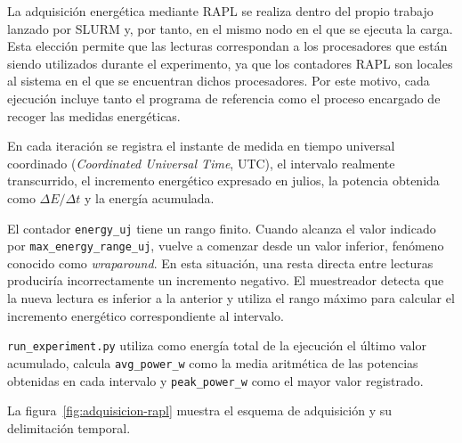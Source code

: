 La adquisición energética mediante RAPL se realiza dentro del propio trabajo lanzado por SLURM y, por tanto, en el mismo nodo en el que se ejecuta la carga. Esta elección permite que las lecturas correspondan a los procesadores que están siendo utilizados durante el experimento, ya que los contadores RAPL son locales al sistema en el que se encuentran dichos procesadores. Por este motivo, cada ejecución incluye tanto el programa de referencia como el proceso encargado de recoger las medidas energéticas.

En cada iteración se registra el instante de medida en tiempo universal coordinado (\textit{Coordinated Universal Time}, UTC), el intervalo realmente transcurrido, el incremento energético expresado en julios, la potencia obtenida como \(\Delta E / \Delta t\) y la energía acumulada.

El contador \texttt{energy\_uj} tiene un rango finito. Cuando alcanza el valor indicado por \texttt{max\_energy\_range\_uj}, vuelve a comenzar desde un valor inferior, fenómeno conocido como \emph{wraparound}. En esta situación, una resta directa entre lecturas produciría incorrectamente un incremento negativo. El muestreador detecta que la nueva lectura es inferior a la anterior y utiliza el rango máximo para calcular el incremento energético correspondiente al intervalo.

\texttt{run\_experiment.py} utiliza como energía total de la ejecución el último valor acumulado, calcula \texttt{avg\_power\_w} como la media aritmética de las potencias obtenidas en cada intervalo y \texttt{peak\_power\_w} como el mayor valor registrado.

La figura~\ref{fig:adquisicion-rapl} muestra el esquema de adquisición y su delimitación temporal.


